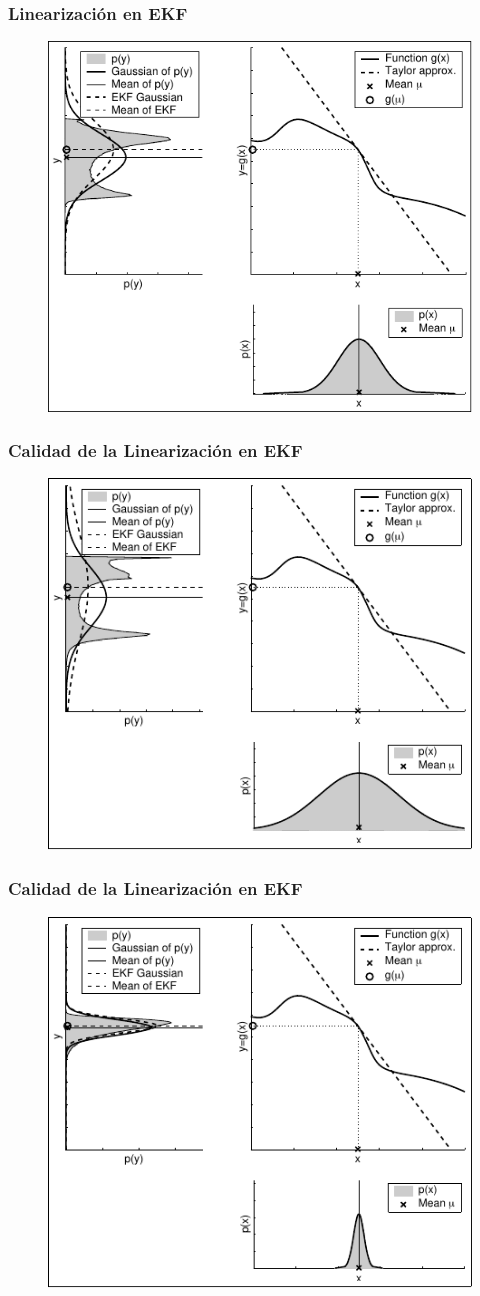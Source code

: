 \begin{frame}
    \frametitle{Linearización en EKF}
    
    \begin{figure}[!h]
        \includegraphics[width=0.5\columnwidth]{./images/linearization_applied_by_ekf.pdf}
    \end{figure}
\end{frame}


\begin{frame}
    \frametitle{Calidad de la Linearización en EKF}
    
    \begin{figure}[!h]
        \includegraphics[width=0.5\columnwidth]{./images/dependency_approximation_quality_spread.pdf}
    \end{figure}
\end{frame}

\begin{frame}
    \frametitle{Calidad de la Linearización en EKF}
    
    \begin{figure}[!h]
        \includegraphics[width=0.5\columnwidth]{./images/dependency_approximation_quality_narrow.pdf}
    \end{figure}
\end{frame}


